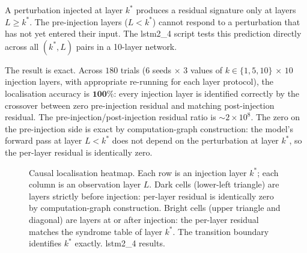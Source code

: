 \documentclass[11pt,a4paper]{article}
\begin{document}
A perturbation injected at layer $k^*$ produces a residual signature only at layers $L \geq k^*$. The pre-injection layers ($L < k^*$) cannot respond to a perturbation that has not yet entered their input. The lstm2\_4 script tests this prediction directly across all $(k^*, L)$ pairs in a 10-layer network.

The result is exact. Across $180$ trials ($6$ seeds $\times$ $3$ values of $k \in \{1, 5, 10\}$ $\times$ $10$ injection layers, with appropriate re-running for each layer protocol), the localisation accuracy is $\mathbf{100\%}$: every injection layer is identified correctly by the crossover between zero pre-injection residual and matching post-injection residual. The pre-injection/post-injection residual ratio is $\sim 2 \times
10^8$. The zero on the pre-injection side is exact by computation-graph construction: the model's forward pass at layer $L < k^*$ does not depend on the perturbation at layer $k^*$, so the per-layer residual is identically zero.

\begin{figure}[H]
\centering
{}
\caption{Causal localisation heatmap. Each row is an injection layer $k^*$; each column is an observation layer $L$. Dark cells (lower-left triangle) are layers strictly before injection: per-layer residual is identically zero by computation-graph construction. Bright cells (upper triangle and diagonal) are layers at or after injection: the per-layer residual matches the syndrome table of layer $k^*$. The transition boundary identifies $k^*$ exactly. lstm2\_4 results.}
\label{fig:causal}
\end{figure}
\end{document}
